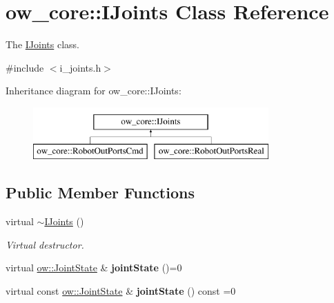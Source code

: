 \hypertarget{classow__core_1_1IJoints}{}\section{ow\+\_\+core\+:\+:I\+Joints Class Reference}
\label{classow__core_1_1IJoints}


The \hyperlink{classow__core_1_1IJoints}{I\+Joints} class.  




{\ttfamily \#include $<$i\+\_\+joints.\+h$>$}

Inheritance diagram for ow\+\_\+core\+:\+:I\+Joints\+:\begin{figure}[H]
\begin{center}
\leavevmode
\includegraphics[height=2.000000cm]{dc/db6/classow__core_1_1IJoints}
\end{center}
\end{figure}
\subsection*{Public Member Functions}
\begin{DoxyCompactItemize}
\item 
virtual \hyperlink{classow__core_1_1IJoints_a576ca1a377472f5aad2a9dcc42da9f67}{$\sim$\+I\+Joints} ()\hypertarget{classow__core_1_1IJoints_a576ca1a377472f5aad2a9dcc42da9f67}{}\label{classow__core_1_1IJoints_a576ca1a377472f5aad2a9dcc42da9f67}

\begin{DoxyCompactList}\small\item\em Virtual destructor. \end{DoxyCompactList}\item 
virtual \hyperlink{classow__core_1_1JointState}{ow\+::\+Joint\+State} \& {\bfseries joint\+State} ()=0\hypertarget{classow__core_1_1IJoints_a1429bd69615f934f10bd0d8915275a0a}{}\label{classow__core_1_1IJoints_a1429bd69615f934f10bd0d8915275a0a}

\item 
virtual const \hyperlink{classow__core_1_1JointState}{ow\+::\+Joint\+State} \& {\bfseries joint\+State} () const =0\hypertarget{classow__core_1_1IJoints_ac9e72e3a6f8096b341591ba364a01f08}{}\label{classow__core_1_1IJoints_ac9e72e3a6f8096b341591ba364a01f08}

\end{DoxyCompactItemize}


